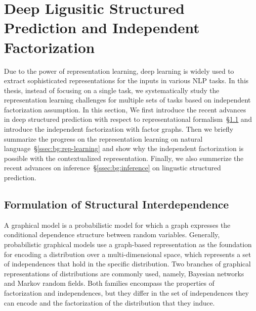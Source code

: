 \section{Deep Ligusitic Structured Prediction and Independent Factorization}
\label{sec:background:deepsp}
Due to the power of representation learning, deep learning is widely
used to extract sophisticated representations for the inputs in
various NLP tasks. In this thesis, instead of focusing on a single
task, we systematically study the representation learning challenges
for multiple sets of tasks based on independent factorization
assumption.  In this section, We first introduce the recent advances
in deep structured prediction with respect to representational
formalism~\S\ref{ssec:bg:formalism} and introduce the independent
factorization with factor graphs. Then we briefly summarize the
progress on the representation learning on natural
language~\S\ref{ssec:bg:rep-learning} and show why the independent
factorization is possible with the contextualized representation.
Finally, we also summerize the recent advances on
inference~\S\ref{ssec:bg:inference} on lingustic structured prediction.


\subsection{Formulation of Structural Interdependence}
\label{ssec:bg:formalism}

 A graphical model is a probabilistic
model for which a graph expresses the conditional dependence structure
between random variables. Generally, probabilistic graphical models
use a graph-based representation as the foundation for encoding a
distribution over a multi-dimensional space, which represents a set of
independences that hold in the specific distribution. Two branches of
graphical representations of distributions are commonly used, namely,
Bayesian networks and Markov random fields. Both families encompass
the properties of factorization and independences, but they differ in
the set of independences they can encode and the factorization of the
distribution that they induce.

